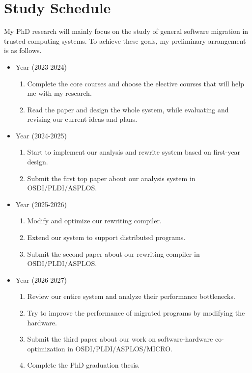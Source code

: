 \section{Study Schedule}
My PhD research will mainly focus on the study of general software migration in trusted computing systems.
To achieve these goals, my preliminary arrangement is as follows.
\begin{itemize}
    \item {} Year (2023-2024)
    \begin{enumerate}
        \item Complete the core courses and choose the elective courses
        that will help me with my research.
        \item Read the paper and design the whole system, while evaluating and revising
        our current ideas and plans.
    \end{enumerate}
    \item {} Year (2024-2025)
        \begin{enumerate}
            \item Start to implement our analysis and rewrite system based on
            first-year design.
            \item Submit the first top paper about our analysis system in OSDI/PLDI/ASPLOS.
        \end{enumerate}
    \item {} Year (2025-2026)
        \begin{enumerate}
            \item Modify and optimize our rewriting compiler.
            \item Extend our system to support distributed programs.
            \item Submit the second paper about our rewriting compiler in OSDI/PLDI/ASPLOS.
        \end{enumerate}
    \item {} Year (2026-2027)
        \begin{enumerate}
            \item Review our entire system and analyze their performance bottlenecks.
            \item Try to improve the performance of migrated programs by
            modifying the hardware.
            \item Submit the third paper about our work on software-hardware co-optimization in OSDI/PLDI/ASPLOS/MICRO.
            \item Complete the PhD graduation thesis.
        \end{enumerate}
\end{itemize}

